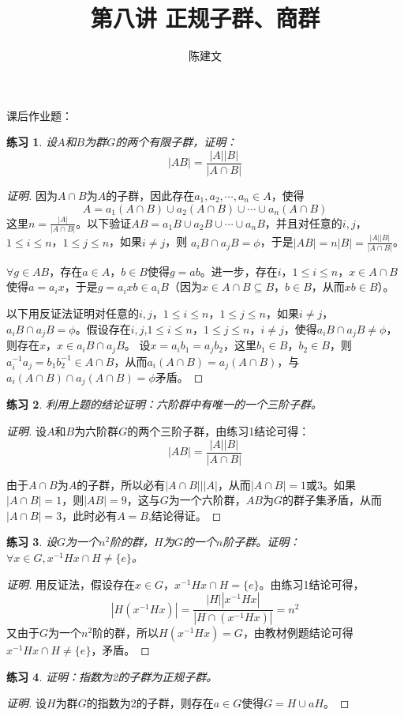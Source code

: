 \documentclass{article}
\newtheorem{Exercise}{练习}
\begin{document}
\begin{CJK*}{UTF8}{gbsn}
  \title{第八讲 正规子群、商群}
  \author{陈建文}
  \maketitle


课后作业题：
\begin{Exercise}
设$A$和$B$为群$G$的两个有限子群，证明：
\[|AB|=\frac{|A||B|}{|A\cap B|}\]
\end{Exercise}
\begin{proof}[证明]
  因为$A\cap B$为$A$的子群，因此存在$a_1,a_2,\cdots,a_n\in A$，使得
  \[A=a_1(A\cap B)\cup a_2(A\cap B)\cup \cdots \cup a_n(A\cap B)\]
  这里$n=\frac{|A|}{|A\cap B|}$。以下验证$AB=a_1B\cup a_2B\cup \cdots \cup a_nB$，并且对任意的$i,j$，$1\leq i \leq n$，$1\leq j \leq n$，如果$i\neq j$，则
  $a_iB\cap a_jB=\phi$，于是$|AB|=n|B|=\frac{|A||B|}{|A\cap B|}$。

  $\forall g\in AB$，存在$a\in A$，$b\in B$使得$g=ab$。进一步，存在$i$，$1\leq i\leq n$，$x\in A\cap B$使得$a=a_ix$，于是$g=a_ixb\in a_iB$（因为$x\in A\cap B\subseteq B$，$b\in B$，从而$xb\in B$）。

以下用反证法证明对任意的$i,j$，$1\leq i \leq n$，$1\leq j \leq n$，如果$i\neq j$，
$a_iB\cap a_jB=\phi$。假设存在$i,j$,$1\leq i \leq n$，$1\leq j \leq n$，$i\neq j$，使得$a_iB\cap a_jB\neq \phi$，则存在$x$，$x\in a_iB\cap a_jB$。
设$x=a_ib_1=a_jb_2$，这里$b_1\in B$，$b_2\in B$，则$a_i^{-1}a_j=b_1b_2^{-1}\in A\cap B$，从而$a_i(A\cap B)=a_j(A\cap B)$，与$a_i(A\cap B)\cap a_j(A\cap B)=\phi$矛盾。

\end{proof}
\begin{Exercise}
  利用上题的结论证明：六阶群中有唯一的一个三阶子群。
\end{Exercise}
\begin{proof}[证明]
  设$A$和$B$为六阶群$G$的两个三阶子群，由练习1结论可得：
  \[|AB|=\frac{|A||B|}{|A\cap B|}\]

  由于$A\cap B$为$A$的子群，所以必有$|A\cap B|||A|$，从而$|A\cap B|=1$或$3$。如果$|A\cap B|=1$，则$|AB|=9$，这与$G$为一个六阶群，$AB$为$G$的群子集矛盾，从而$|A\cap B|=3$，此时必有$A=B$,结论得证。
\end{proof}
\begin{Exercise}
设$G$为一个$n^2$阶的群，$H$为$G$的一个$n$阶子群。证明：$\forall x\in G, x^{-1}Hx\cap H \neq \{e\}$。
\end{Exercise}
\begin{proof}[证明]
  用反证法，假设存在$x\in G$，$x^{-1}Hx\cap H = \{e\}$。由练习1结论可得，
  \[|H(x^{-1}Hx)|=\frac{|H||x^{-1}Hx|}{|H\cap (x^{-1}Hx)|}=n^2\]
  又由于$G$为一个$n^2$阶的群，所以$H(x^{-1}Hx)=G$，由教材例题结论可得$x^{-1}Hx\cap H \neq \{e\}$，矛盾。
\end{proof}
\begin{Exercise}
证明：指数为2的子群为正规子群。
\end{Exercise}
\begin{proof}[证明]
  设$H$为群$G$的指数为2的子群，则存在$a\in G$使得$G=H\cup aH$。



\end{proof}
\end{CJK*}
\end{document}
